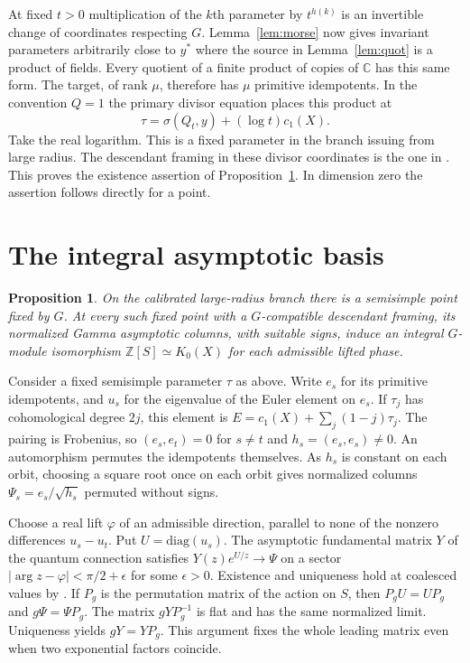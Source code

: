\documentclass[11pt]{amsart}
\newtheorem{proposition}[theorem]{Proposition}
\theoremstyle{definition}
\newcommand{\C}{\mathbb C}
\newcommand{\Z}{\mathbb Z}
\begin{document}
At fixed $t>0$ multiplication of the $k$th parameter by $t^{h(k)}$ is an invertible change of coordinates respecting $G$. Lemma~\ref{lem:morse} now gives invariant parameters arbitrarily close to $y^*$ where the source in Lemma~\ref{lem:quot} is a product of fields. Every quotient of a finite product of copies of $\C$ has this same form. The target, of rank $\mu$, therefore has $\mu$ primitive idempotents. In the convention $Q=1$ the primary divisor equation places this product at
\[
                   \tau=\sigma(Q_t,y)+(\log t)c_1(X).
\]
Take the real logarithm. This is a fixed parameter in the branch issuing from large radius. The descendant framing in these divisor coordinates is the one in \cite[\S2.3, Proposition~2.4]{Iri}. This proves the existence assertion of Proposition~\ref{thm:main}. In dimension zero the assertion follows directly for a point.



\section{The integral asymptotic basis}\label{sec:lattice}

\begin{proposition}\label{thm:main}
On the calibrated large-radius branch there is a semisimple point fixed by $G$. At every such fixed point with a $G$-compatible descendant framing, its normalized Gamma asymptotic columns, with suitable signs, induce an integral $G$-module isomorphism $\Z[S]\simeq K_0(X)$ for each admissible lifted phase.
\end{proposition}
Consider a fixed semisimple parameter $\tau$ as above. Write $e_s$ for its primitive idempotents, and $u_s$ for the eigenvalue of the Euler element on $e_s$. If $\tau_j$ has cohomological degree $2j$, this element is $E=c_1(X)+\sum_j(1-j)\tau_j$. The pairing is Frobenius, so $(e_s,e_t)=0$ for $s\ne t$ and $h_s=(e_s,e_s)\ne0$. An automorphism permutes the idempotents themselves. As $h_s$ is constant on each orbit, choosing a square root once on each orbit gives normalized columns $\Psi_s=e_s/\sqrt{h_s}$ permuted without signs.

Choose a real lift $\varphi$ of an admissible direction, parallel to none of the nonzero differences $u_s-u_t$. Put $U=\mathrm{diag}(u_s)$. The asymptotic fundamental matrix $Y$ of the quantum connection satisfies $Y(z)e^{U/z}\to\Psi$ on a sector $|\arg z-\varphi|<\pi/2+\epsilon$ for some $\epsilon>0$. Existence and uniqueness hold at coalesced values by \cite[Proposition~2.5.1]{GGI}. If $P_g$ is the permutation matrix of the action on $S$, then $P_gU=UP_g$ and $g\Psi=\Psi P_g$. The matrix $gY P_g^{-1}$ is flat and has the same normalized limit. Uniqueness yields $gY=Y P_g$. This argument fixes the whole leading matrix even when two exponential factors coincide.
\end{document}
